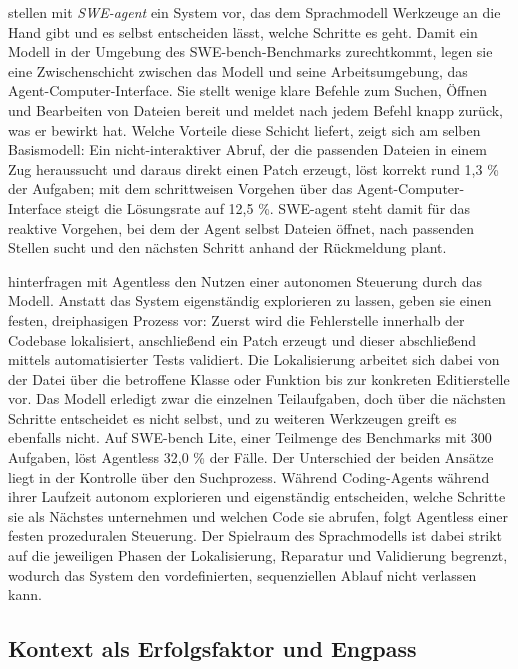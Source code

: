 \textcite{yang2024sweagent} stellen mit \textit{SWE-agent} ein System vor, das dem Sprachmodell Werkzeuge an die Hand gibt und es selbst entscheiden lässt, welche Schritte es geht. Damit ein Modell in der Umgebung des SWE-bench-Benchmarks zurechtkommt, legen sie eine Zwischenschicht zwischen das Modell und seine Arbeitsumgebung, das Agent-Computer-Interface. Sie stellt wenige klare Befehle zum Suchen, Öffnen und Bearbeiten von Dateien bereit und meldet nach jedem Befehl knapp zurück, was er bewirkt hat. Welche Vorteile diese Schicht liefert, zeigt sich am selben Basismodell: Ein nicht-interaktiver Abruf, der die passenden Dateien in einem Zug heraussucht und daraus direkt einen Patch erzeugt, löst korrekt rund 1,3 \% der Aufgaben; mit dem schrittweisen Vorgehen über das Agent-Computer-Interface steigt die Lösungsrate auf 12,5 \%. SWE-agent steht damit für das reaktive Vorgehen, bei dem der Agent selbst Dateien öffnet, nach passenden Stellen sucht und den nächsten Schritt anhand der Rückmeldung plant.

\textcite{xia2024agentless} hinterfragen mit Agentless den Nutzen einer autonomen Steuerung durch das Modell. Anstatt das System eigenständig explorieren zu lassen, geben sie einen festen, dreiphasigen Prozess vor: Zuerst wird die Fehlerstelle innerhalb der Codebase lokalisiert, anschließend ein Patch erzeugt und dieser abschließend mittels automatisierter Tests validiert. Die Lokalisierung arbeitet sich dabei von der Datei über die betroffene Klasse oder Funktion bis zur konkreten Editierstelle vor. Das Modell erledigt zwar die einzelnen Teilaufgaben, doch über die nächsten Schritte entscheidet es nicht selbst, und zu weiteren Werkzeugen greift es ebenfalls nicht. Auf SWE-bench Lite, einer Teilmenge des Benchmarks mit 300 Aufgaben, löst Agentless 32,0 \% der Fälle. Der Unterschied der beiden Ansätze liegt in der Kontrolle über den Suchprozess. Während Coding-Agents während ihrer Laufzeit autonom explorieren und eigenständig entscheiden, welche Schritte sie als Nächstes unternehmen und welchen Code sie abrufen, folgt Agentless einer festen prozeduralen Steuerung. Der Spielraum des Sprachmodells ist dabei strikt auf die jeweiligen Phasen der Lokalisierung, Reparatur und Validierung begrenzt, wodurch das System den vordefinierten, sequenziellen Ablauf nicht verlassen kann.

\subsection{Kontext als Erfolgsfaktor und Engpass}


